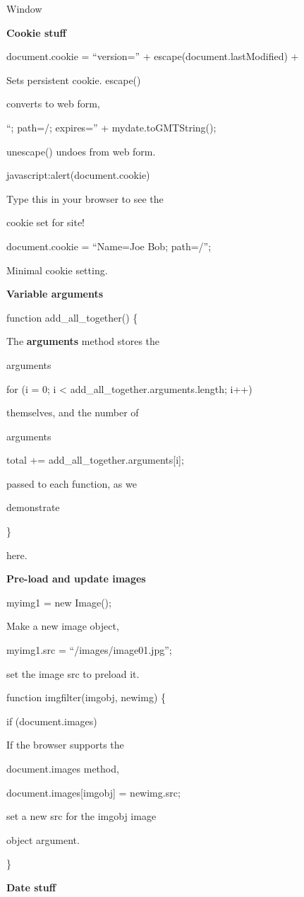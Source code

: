 \documentclass[
]{article}
\begin{document}
Window

\textbf{Cookie stuff}

document.cookie = ``version='' + escape(document.lastModified) +

Sets persistent cookie. escape()

converts to web form,

``; path=/; expires='' + mydate.toGMTString();

unescape() undoes from web form.

javascript:alert(document.cookie)

Type this in your browser to see the

cookie set for site!

document.cookie = ``Name=Joe Bob; path=/'';

Minimal cookie setting.

\textbf{Variable arguments}

function add\_all\_together() \{

The \textbf{arguments} method stores the

arguments

for (i = 0; i \textless{} add\_all\_together.arguments.length; i++)

themselves, and the number of

arguments

total += add\_all\_together.arguments{[}i{]};

passed to each function, as we

demonstrate

\}

here.

\textbf{Pre-load and update images}

myimg1 = new Image();

Make a new image object,

myimg1.src = ``/images/image01.jpg'';

set the image src to preload it.

function imgfilter(imgobj, newimg) \{

if (document.images)

If the browser supports the

document.images method,

document.images{[}imgobj{]} = newimg.src;

set a new src for the imgobj image

object argument.

\}

\textbf{Date stuff}
\end{document}
